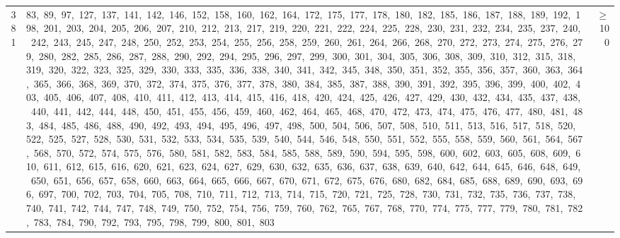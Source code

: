 \begin{longtable}{c|p{}|r}
381 & 83,\ 89,\ 97,\ 127,\ 137,\ 141,\ 142,\ 146,\ 152,\ 158,\ 160,\ 162,\ 164,\ 172,\ 175,\ 177,\ 178,\ 180,\ 182,\ 185,\ 186,\ 187,\ 188,\ 189,\ 192,\ 198,\ 201,\ 203,\ 204,\ 205,\ 206,\ 207,\ 210,\ 212,\ 213,\ 217,\ 219,\ 220,\ 221,\ 222,\ 224,\ 225,\ 228,\ 230,\ 231,\ 232,\ 234,\ 235,\ 237,\ 240,\ 242,\ 243,\ 245,\ 247,\ 248,\ 250,\ 252,\ 253,\ 254,\ 255,\ 256,\ 258,\ 259,\ 260,\ 261,\ 264,\ 266,\ 268,\ 270,\ 272,\ 273,\ 274,\ 275,\ 276,\ 279,\ 280,\ 282,\ 285,\ 286,\ 287,\ 288,\ 290,\ 292,\ 294,\ 295,\ 296,\ 297,\ 299,\ 300,\ 301,\ 304,\ 305,\ 306,\ 308,\ 309,\ 310,\ 312,\ 315,\ 318,\ 319,\ 320,\ 322,\ 323,\ 325,\ 329,\ 330,\ 333,\ 335,\ 336,\ 338,\ 340,\ 341,\ 342,\ 345,\ 348,\ 350,\ 351,\ 352,\ 355,\ 356,\ 357,\ 360,\ 363,\ 364,\ 365,\ 366,\ 368,\ 369,\ 370,\ 372,\ 374,\ 375,\ 376,\ 377,\ 378,\ 380,\ 384,\ 385,\ 387,\ 388,\ 390,\ 391,\ 392,\ 395,\ 396,\ 399,\ 400,\ 402,\ 403,\ 405,\ 406,\ 407,\ 408,\ 410,\ 411,\ 412,\ 413,\ 414,\ 415,\ 416,\ 418,\ 420,\ 424,\ 425,\ 426,\ 427,\ 429,\ 430,\ 432,\ 434,\ 435,\ 437,\ 438,\ 440,\ 441,\ 442,\ 444,\ 448,\ 450,\ 451,\ 455,\ 456,\ 459,\ 460,\ 462,\ 464,\ 465,\ 468,\ 470,\ 472,\ 473,\ 474,\ 475,\ 476,\ 477,\ 480,\ 481,\ 483,\ 484,\ 485,\ 486,\ 488,\ 490,\ 492,\ 493,\ 494,\ 495,\ 496,\ 497,\ 498,\ 500,\ 504,\ 506,\ 507,\ 508,\ 510,\ 511,\ 513,\ 516,\ 517,\ 518,\ 520,\ 522,\ 525,\ 527,\ 528,\ 530,\ 531,\ 532,\ 533,\ 534,\ 535,\ 539,\ 540,\ 544,\ 546,\ 548,\ 550,\ 551,\ 552,\ 555,\ 558,\ 559,\ 560,\ 561,\ 564,\ 567,\ 568,\ 570,\ 572,\ 574,\ 575,\ 576,\ 580,\ 581,\ 582,\ 583,\ 584,\ 585,\ 588,\ 589,\ 590,\ 594,\ 595,\ 598,\ 600,\ 602,\ 603,\ 605,\ 608,\ 609,\ 610,\ 611,\ 612,\ 615,\ 616,\ 620,\ 621,\ 623,\ 624,\ 627,\ 629,\ 630,\ 632,\ 635,\ 636,\ 637,\ 638,\ 639,\ 640,\ 642,\ 644,\ 645,\ 646,\ 648,\ 649,\ 650,\ 651,\ 656,\ 657,\ 658,\ 660,\ 663,\ 664,\ 665,\ 666,\ 667,\ 670,\ 671,\ 672,\ 675,\ 676,\ 680,\ 682,\ 684,\ 685,\ 688,\ 689,\ 690,\ 693,\ 696,\ 697,\ 700,\ 702,\ 703,\ 704,\ 705,\ 708,\ 710,\ 711,\ 712,\ 713,\ 714,\ 715,\ 720,\ 721,\ 725,\ 728,\ 730,\ 731,\ 732,\ 735,\ 736,\ 737,\ 738,\ 740,\ 741,\ 742,\ 744,\ 747,\ 748,\ 749,\ 750,\ 752,\ 754,\ 756,\ 759,\ 760,\ 762,\ 765,\ 767,\ 768,\ 770,\ 774,\ 775,\ 777,\ 779,\ 780,\ 781,\ 782,\ 783,\ 784,\ 790,\ 792,\ 793,\ 795,\ 798,\ 799,\ 800,\ 801,\ 803 & $\ge$ 100 \\

\end{longtable}
